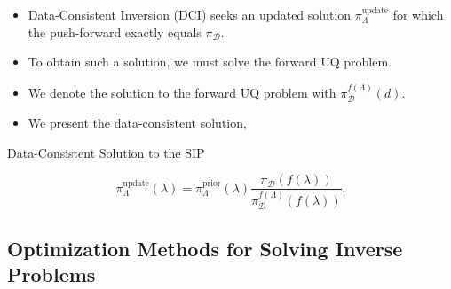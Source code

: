 \documentclass[11pt]{beamer}
\begin{document}
\begin{frame}

\begin{itemize}

	\item Data-Consistent Inversion (DCI) seeks an updated solution $\pi_\Lambda^\text{update}$ for which the push-forward exactly equals $\pi_\mathcal{D}$. 
	
	\item To obtain such a solution, we must solve the forward UQ  problem.
	
	\item We denote the solution to the forward  UQ problem with $\pi_\mathcal{D}^{f(\Lambda)}(d)$.




	\item We present the data-consistent solution,

\end{itemize}

\begin{block}{Data-Consistent Solution to the SIP  \footnotemark[1]}

\begin{equation} \label{eq:1}
\pi_\Lambda^\text{update}(\lambda)=\pi_\Lambda^\text{prior}(\lambda)\frac{\pi_\mathcal{D}(f(\lambda))}{\pi_\mathcal{D}^{f(\Lambda)}(f(\lambda))}.
\end{equation}

\end{block}



\end{frame}

\subsection{Optimization Methods for Solving Inverse Problems}
\end{document}

